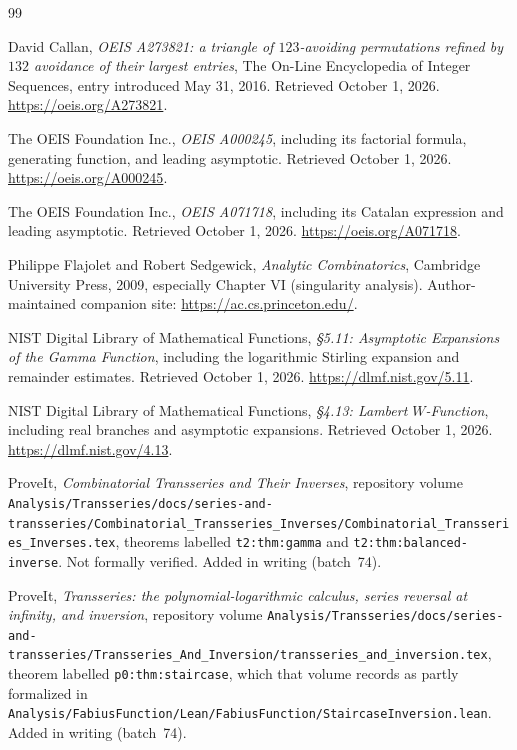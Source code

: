 \documentclass[11pt]{article}
\numberwithin{equation}{section}
\theoremstyle{definition}
\begin{document}
\clearpage
\begin{thebibliography}{99}
\raggedright
{}
David Callan, \emph{OEIS A273821: a triangle of $123$-avoiding permutations
refined by $132$ avoidance of their largest entries}, The On-Line
Encyclopedia of Integer Sequences, entry introduced May 31, 2016.
Retrieved October 1, 2026. \url{https://oeis.org/A273821}.

The OEIS Foundation Inc., \emph{OEIS A000245}, including its factorial
formula, generating function, and leading asymptotic. Retrieved October 1,
2026. \url{https://oeis.org/A000245}.

The OEIS Foundation Inc., \emph{OEIS A071718}, including its Catalan
expression and leading asymptotic. Retrieved October 1, 2026.
\url{https://oeis.org/A071718}.

Philippe Flajolet and Robert Sedgewick,
\emph{Analytic Combinatorics}, Cambridge University Press, 2009,
especially Chapter VI (singularity analysis).
Author-maintained companion site: \url{https://ac.cs.princeton.edu/}.

NIST Digital Library of Mathematical Functions,
\emph{\S5.11: Asymptotic Expansions of the Gamma Function},
including the logarithmic Stirling expansion and remainder estimates.
Retrieved October 1, 2026. \url{https://dlmf.nist.gov/5.11}.

NIST Digital Library of Mathematical Functions,
\emph{\S4.13: Lambert $W$-Function}, including real branches and asymptotic
expansions. Retrieved October 1, 2026. \url{https://dlmf.nist.gov/4.13}.

ProveIt, \emph{Combinatorial Transseries and Their Inverses}, repository
volume
\nolinkurl{Analysis/Transseries/docs/series-and-transseries/Combinatorial_Transseries_Inverses/Combinatorial_Transseries_Inverses.tex},
theorems labelled \texttt{t2:thm:gamma} and \texttt{t2:thm:balanced-inverse}.
Not formally verified. Added in writing (batch~74).

ProveIt, \emph{Transseries: the polynomial-logarithmic calculus, series
reversal at infinity, and inversion}, repository volume
\nolinkurl{Analysis/Transseries/docs/series-and-transseries/Transseries_And_Inversion/transseries_and_inversion.tex},
theorem labelled \texttt{p0:thm:staircase}, which that volume records as
partly formalized in
\nolinkurl{Analysis/FabiusFunction/Lean/FabiusFunction/StaircaseInversion.lean}.
Added in writing (batch~74).


\end{thebibliography}
\end{document}
